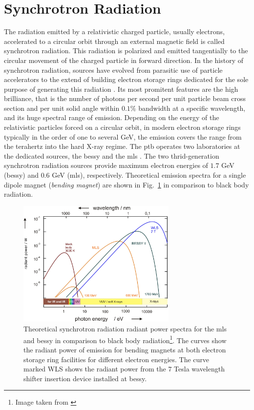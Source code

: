 \section{Synchrotron Radiation}
The radiation emitted by a relativistic charged particle, usually electrons, accelerated to a circular orbit through an external magnetic field is called synchrotron radiation. This radiation is polarized and emitted tangentially to the circular movement of the charged particle in forward direction. In the history of synchrotron radiation, sources have evolved from parasitic use of particle accelerators to the extend of building electron storage rings dedicated for the sole purpose of generating this radiation \cite{munro_chapter_1987}. Its most promitent features are the high brilliance, that is the number of photons per second per unit particle beam cross section and per unit solid angle within $0.1\%$ bandwidth at a specific wavelength, and its huge spectral range of emission. Depending on the energy of the relativistic particles forced on a circular orbit, in modern electron storage rings typically in the order of one to several GeV, the emission covers the range from the terahertz into the hard X-ray regime. The \gls{ptb} operates two laboratories at the dedicated sources, the \gls{bessy} and the \gls{mls} \cite{brandt_metrology_2007}. The two thrid-generation synchrotron radiation sources provide maximum electron energies of $1.7$ GeV (\gls{bessy}) and $0.6$ GeV (\gls{mls}), respectively. Theoretical emission spectra for a single dipole magnet (\emph{bending magnet}) are shown in Fig.~\ref{ch_exp:fig_experimental_synchrotron_spectra} in comparison to black body radiation.
\begin{figure}
 \includegraphics[width=0.7\textwidth]{img/exp-bessy-dipole-spectrum.jpeg}
 \caption[Theoretical synchrotron radiation radiant power spectra]{Theoretical synchrotron radiation radiant power spectra for the \gls{mls} and \gls{bessy} in comparison to black body radiation\footnote{Image taken from \textcite{beckhoff_quarter-century_2009}}. The curves show the radiant power of emission for bending magnets at both electron storage ring facilities for different electron energies. The curve marked WLS shows the radiant power from the $7$ Tesla wavelength shifter insertion device installed at \gls{bessy}.}
 \label{ch_exp:fig_experimental_synchrotron_spectra}
\end{figure}


